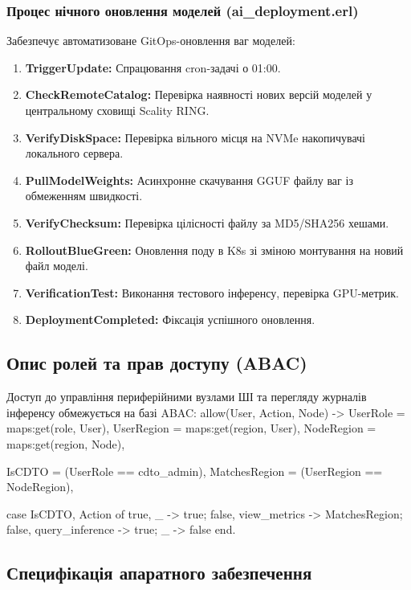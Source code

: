 \documentclass{article}
\let\originalfootnotesize\footnotesize
\let\oldverbatim\verbatim
\let\oldendverbatim\endverbatim
\renewenvironment{verbatim}{\originalfootnotesize\oldverbatim}{\oldendverbatim}
\begin{document}
\subsubsection{Процес нічного оновлення моделей (ai\_deployment.erl)}
Забезпечує автоматизоване GitOps-оновлення ваг моделей:
\begin{enumerate}
    \item \textbf{TriggerUpdate:} Спрацювання cron-задачі о 01:00.
    \item \textbf{CheckRemoteCatalog:} Перевірка наявності нових версій моделей у центральному сховищі Scality RING.
    \item \textbf{VerifyDiskSpace:} Перевірка вільного місця на NVMe накопичувачі локального сервера.
    \item \textbf{PullModelWeights:} Асинхронне скачування GGUF файлу ваг із обмеженням швидкості.
    \item \textbf{VerifyChecksum:} Перевірка цілісності файлу за MD5/SHA256 хешами.
    \item \textbf{RolloutBlueGreen:} Оновлення поду в K8s зі зміною монтування на новий файл моделі.
    \item \textbf{VerificationTest:} Виконання тестового інференсу, перевірка GPU-метрик.
    \item \textbf{DeploymentCompleted:} Фіксація успішного оновлення.
\end{enumerate}

\subsection{Опис ролей та прав доступу (ABAC)}
Доступ до управління периферійними вузлами ШІ та перегляду журналів інференсу обмежується на базі ABAC:
\begin{verbatim}
allow(User, Action, Node) ->
    UserRole = maps:get(role, User),
    UserRegion = maps:get(region, User),
    NodeRegion = maps:get(region, Node),
    
    IsCDTO = (UserRole == cdto_admin),
    MatchesRegion = (UserRegion == NodeRegion),
    
    case {IsCDTO, Action} of
        {true, _} -> true;
        {false, view_metrics} -> MatchesRegion;
        {false, query_inference} -> true;
        _ -> false
    end.
\end{verbatim}

\subsection{Специфікація апаратного забезпечення}
\end{document}
